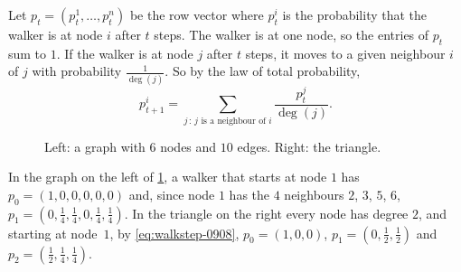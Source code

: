 Let $p_t = (p_t^1, \dots, p_t^n)$ be the row vector where $p_t^i$ is the probability that the walker
is at node $i$ after $t$ steps. The walker is at one node, so the entries of $p_t$ sum to $1$. If
the walker is at node $j$ after $t$ steps, it moves to a given neighbour $i$ of $j$ with probability
$\frac{1}{\deg(j)}$. So by the law of total probability,
\begin{equation}\label{eq:walkstep-0908}
    p_{t+1}^i = \sum_{j \,:\, j \text{ is a neighbour of } i} \frac{p_t^j}{\deg(j)}.
\end{equation}

\begin{figure}[ht]
    \centering
    \caption{Left: a graph with $6$ nodes and $10$ edges. Right: the triangle.}
    \label{fig:walks-0908}
\end{figure}

\begin{example}\label{exa:walks-0908}
    In the graph on the left of \cref{fig:walks-0908}, a walker that starts at node $1$ has
    $p_0 = (1, 0, 0, 0, 0, 0)$ and, since node $1$ has the $4$ neighbours $2$, $3$, $5$, $6$,
    $p_1 = \left(0, \tfrac{1}{4}, \tfrac{1}{4}, 0, \tfrac{1}{4}, \tfrac{1}{4}\right)$. In the triangle
    on the right every node has degree $2$, and starting at node~$1$, by \cref{eq:walkstep-0908},
    $p_0 = (1, 0, 0)$, $p_1 = \left(0, \tfrac{1}{2}, \tfrac{1}{2}\right)$ and
    $p_2 = \left(\tfrac{1}{2}, \tfrac{1}{4}, \tfrac{1}{4}\right)$.
\end{example}

